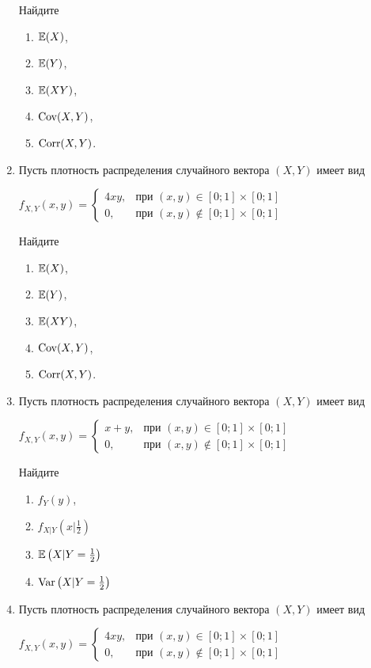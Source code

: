 \begin{enumerate}
Найдите
\begin{enumerate}
\item $\mathbb{E}(X)$,
\item $\mathbb{E}(Y)$,
\item $\mathbb{E}(XY)$,
\item $\operatorname{Cov}(X,Y)$,
\item $\operatorname{Corr}(X,Y)$.
\end{enumerate}

\item Пусть плотность распределения случайного вектора $(X,Y)$ имеет вид
\begin{center} $f_{X,Y}(x,y) = \begin{cases} 4xy, & \text{при } (x,y) \in [0;1] \times [0;1] \\ 0 , & \text{при } (x,y) \not\in [0;1] \times [0;1] \end{cases}$  \end{center}

Найдите
\begin{enumerate}
\item $\mathbb{E}(X)$,
\item $\mathbb{E}(Y)$,
\item $\mathbb{E}(XY)$,
\item $\operatorname{Cov}(X,Y)$,
\item $\operatorname{Corr}(X,Y)$.
\end{enumerate}

\item Пусть плотность распределения случайного вектора $(X,Y)$ имеет вид
\begin{center} $f_{X,Y}(x,y) = \begin{cases} x+y, & \text{при } (x,y) \in [0;1] \times [0;1] \\ 0 , & \text{при } (x,y) \not\in [0;1] \times [0;1] \end{cases}$  \end{center}

Найдите
\begin{enumerate}
\item $f_{Y}(y)$,
\item $f_{X|Y}\left(x|\frac{1}{2}\right)$
\item $\mathbb{E}\left(X|Y = \frac{1}{2}\right)$
\item $\operatorname{Var}\left(X|Y = \frac{1}{2}\right)$
\end{enumerate}

\item Пусть плотность распределения случайного вектора $(X,Y)$ имеет вид
\begin{center} $f_{X,Y}(x,y) = \begin{cases} 4xy, & \text{при } (x,y) \in [0;1] \times [0;1] \\ 0 , & \text{при } (x,y) \not\in [0;1] \times [0;1] \end{cases}$  \end{center}


\end{enumerate}
